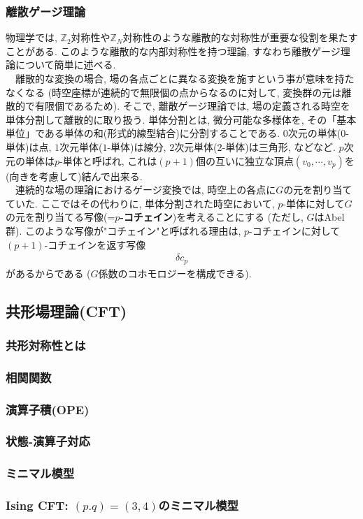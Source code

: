 \subsubsection{離散ゲージ理論}
物理学では, $\mathbb{Z}_2$対称性や$\mathbb{Z}_{N}$対称性のような離散的な対称性が重要な役割を果たすことがある. 
このような離散的な内部対称性を持つ理論, すなわち離散ゲージ理論について簡単に述べる. \\
　離散的な変換の場合, 場の各点ごとに異なる変換を施すという事が意味を持たなくなる
(時空座標が連続的で無限個の点からなるのに対して, 変換群の元は離散的で有限個であるため). 
そこで, 離散ゲージ理論では, 場の定義される時空を単体分割して離散的に取り扱う. 
単体分割とは, 微分可能な多様体を, その「基本単位」である単体の和(形式的線型結合)に分割することである. 
$0$次元の単体($0$-単体)は点, $1$次元単体($1$-単体)は線分, $2$次元単体($2$-単体)は三角形, などなど. 
$p$次元の単体は$p$-単体と呼ばれ, これは$(p+1)$個の互いに独立な頂点$(v_0, \cdots, v_p)$を(向きを考慮して)結んで出来る. \\
　連続的な場の理論におけるゲージ変換では, 時空上の各点に$G$の元を割り当てていた. 
ここではその代わりに, 単体分割された時空において, $p$-単体に対して$G$の元を割り当てる写像(=\textbf{$p$-コチェイン})を考えることにする
(ただし, $G$はAbel群). 
このような写像が"コチェイン"と呼ばれる理由は, $p$-コチェインに対して$(p+1)$-コチェインを返す写像
\begin{align}
    \delta c_p
\end{align}
があるからである
($G$係数のコホモロジーを構成できる). 
\subsection{共形場理論(CFT)}
\subsubsection{共形対称性とは}
\subsubsection{相関関数}
\subsubsection{演算子積(OPE)}

\subsubsection{状態-演算子対応}
\subsubsection{ミニマル模型}
\subsubsection{Ising CFT: $(p.q)=(3,4)$のミニマル模型}